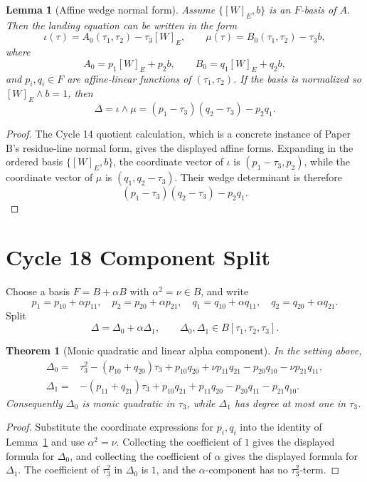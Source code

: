 \documentclass[11pt]{article}
\newtheorem{theorem}{Theorem}
\newtheorem{lemma}{Lemma}
\newcommand{\Deltaone}{\Delta_1}
\newcommand{\Deltazero}{\Delta_0}
\newcommand{\tauone}{\tau_1}
\newcommand{\tautwo}{\tau_2}
\newcommand{\tauthree}{\tau_3}
\begin{document}
\begin{lemma}[Affine wedge normal form]
\label{lem:affine-wedge}
Assume \(\{[W]_E,b\}\) is an \(F\)-basis of \(A\).  Then the landing equation can
be written in the form
\[
  \iota(\tau)=A_0(\tauone,\tautwo)-\tauthree [W]_E,
  \qquad
  \mu(\tau)=B_0(\tauone,\tautwo)-\tauthree b,
\]
where
\[
  A_0=p_1[W]_E+p_2 b,
  \qquad
  B_0=q_1[W]_E+q_2 b,
\]
and \(p_i,q_i\in F\) are affine-linear functions of
\((\tauone,\tautwo)\).  If the basis is normalized so \([W]_E\wedge b=1\), then
\[
  \Delta=\iota\wedge\mu
    =(p_1-\tauthree)(q_2-\tauthree)-p_2q_1.
\]
\end{lemma}

\begin{proof}
The Cycle 14 quotient calculation, which is a concrete instance of Paper B's
residue-line normal form, gives the displayed affine forms.  Expanding in the
ordered basis \(\{[W]_E,b\}\), the coordinate vector of \(\iota\) is
\((p_1-\tauthree,p_2)\), while the coordinate vector of \(\mu\) is
\((q_1,q_2-\tauthree)\).  Their wedge determinant is therefore
\[
  (p_1-\tauthree)(q_2-\tauthree)-p_2q_1.
\]
\end{proof}

\section{Cycle 18 Component Split}
\label{sec:cycle18}

Choose a basis \(F=B+\alpha B\) with \(\alpha^2=\nu\in B\), and write
\[
  p_1=p_{10}+\alpha p_{11},\quad
  p_2=p_{20}+\alpha p_{21},\quad
  q_1=q_{10}+\alpha q_{11},\quad
  q_2=q_{20}+\alpha q_{21}.
\]
Split
\[
  \Delta=\Deltazero+\alpha\Deltaone,
  \qquad
  \Deltazero,\Deltaone\in B[\tauone,\tautwo,\tauthree].
\]

\begin{theorem}[Monic quadratic and linear alpha component]
\label{thm:component-split}
In the setting above,
\[
\begin{aligned}
\Deltazero={}&
  \tauthree^2-(p_{10}+q_{20})\tauthree
  +p_{10}q_{20}+\nu p_{11}q_{21}
  -p_{20}q_{10}-\nu p_{21}q_{11},\\
\Deltaone={}&
  -(p_{11}+q_{21})\tauthree
  +p_{10}q_{21}+p_{11}q_{20}-p_{20}q_{11}-p_{21}q_{10}.
\end{aligned}
\]
Consequently \(\Deltazero\) is monic quadratic in \(\tauthree\), while
\(\Deltaone\) has degree at most one in \(\tauthree\).
\end{theorem}

\begin{proof}
Substitute the coordinate expressions for \(p_i,q_i\) into the identity of
Lemma~\ref{lem:affine-wedge} and use \(\alpha^2=\nu\).  Collecting the
coefficient of \(1\) gives the displayed formula for \(\Deltazero\), and
collecting the coefficient of \(\alpha\) gives the displayed formula for
\(\Deltaone\).  The coefficient of \(\tauthree^2\) in \(\Deltazero\) is \(1\),
and the \(\alpha\)-component has no \(\tauthree^2\)-term.
\end{proof}
\end{document}
